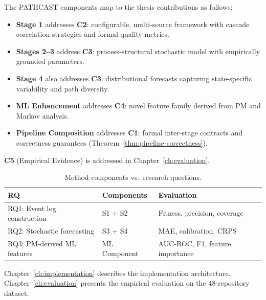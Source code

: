 The PATHCAST components map to the thesis contributions as follows:

\begin{itemize}
  \item \textbf{Stage 1} addresses \textbf{C2}: configurable, multi-source
  framework with cascade correlation strategies and formal quality metrics.
  \item \textbf{Stages 2--3} address \textbf{C3}: process-structural
  stochastic model with empirically grounded parameters.
  \item \textbf{Stage 4} also addresses \textbf{C3}: distributional
  forecasts capturing state-specific variability and path diversity.
  \item \textbf{ML Enhancement} addresses \textbf{C4}: novel feature
  family derived from PM and Markov analysis.
  \item \textbf{Pipeline Composition} addresses \textbf{C1}: formal
  inter-stage contracts and correctness guarantees
  (Theorem~\ref{thm:pipeline-correctness}).
\end{itemize}

\textbf{C5} (Empirical Evidence) is addressed in Chapter~\ref{ch:evaluation}.

\begin{table}[htbp]
\centering
\caption{Method components vs.\ research questions.}
\label{tab:method-rq-mapping}
\begin{tabular}{lll}
\toprule
\textbf{RQ} & \textbf{Components} & \textbf{Evaluation} \\
\midrule
RQ1: Event log construction       & S1 + S2          & Fitness, precision, coverage \\
RQ2: Stochastic forecasting       & S3 + S4          & MAE, calibration, CRPS \\
RQ3: PM-derived ML features       & ML Component     & AUC-ROC, F1, feature importance \\
\bottomrule
\end{tabular}
\end{table}

Chapter~\ref{ch:implementation} describes the implementation architecture.
Chapter~\ref{ch:evaluation} presents the empirical evaluation on the
48-repository dataset.
